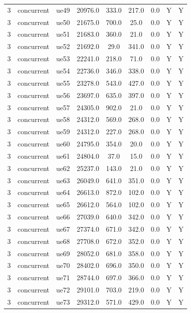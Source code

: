 \begin{table}[ht]
\begin{tabular}{|c|c|c|c|c|c|c|c|c|}
3 & concurrent & ue49 & 20976.0 & 333.0 & 217.0 & 0.0 & Y & Y \\
3 & concurrent & ue50 & 21675.0 & 700.0 & 25.0 & 0.0 & Y & Y \\
3 & concurrent & ue51 & 21683.0 & 360.0 & 21.0 & 0.0 & Y & Y \\
3 & concurrent & ue52 & 21692.0 & 29.0 & 341.0 & 0.0 & Y & Y \\
3 & concurrent & ue53 & 22241.0 & 218.0 & 71.0 & 0.0 & Y & Y \\
3 & concurrent & ue54 & 22736.0 & 346.0 & 338.0 & 0.0 & Y & Y \\
3 & concurrent & ue55 & 23278.0 & 543.0 & 427.0 & 0.0 & Y & Y \\
3 & concurrent & ue56 & 23697.0 & 635.0 & 397.0 & 0.0 & Y & Y \\
3 & concurrent & ue57 & 24305.0 & 902.0 & 21.0 & 0.0 & Y & Y \\
3 & concurrent & ue58 & 24312.0 & 569.0 & 268.0 & 0.0 & Y & Y \\
3 & concurrent & ue59 & 24312.0 & 227.0 & 268.0 & 0.0 & Y & Y \\
3 & concurrent & ue60 & 24795.0 & 354.0 & 20.0 & 0.0 & Y & Y \\
3 & concurrent & ue61 & 24804.0 & 37.0 & 15.0 & 0.0 & Y & Y \\
3 & concurrent & ue62 & 25237.0 & 143.0 & 21.0 & 0.0 & Y & Y \\
3 & concurrent & ue63 & 26049.0 & 641.0 & 351.0 & 0.0 & Y & Y \\
3 & concurrent & ue64 & 26613.0 & 872.0 & 102.0 & 0.0 & Y & Y \\
3 & concurrent & ue65 & 26612.0 & 564.0 & 102.0 & 0.0 & Y & Y \\
3 & concurrent & ue66 & 27039.0 & 640.0 & 342.0 & 0.0 & Y & Y \\
3 & concurrent & ue67 & 27374.0 & 671.0 & 342.0 & 0.0 & Y & Y \\
3 & concurrent & ue68 & 27708.0 & 672.0 & 352.0 & 0.0 & Y & Y \\
3 & concurrent & ue69 & 28052.0 & 681.0 & 358.0 & 0.0 & Y & Y \\
3 & concurrent & ue70 & 28402.0 & 696.0 & 350.0 & 0.0 & Y & Y \\
3 & concurrent & ue71 & 28744.0 & 697.0 & 366.0 & 0.0 & Y & Y \\
3 & concurrent & ue72 & 29101.0 & 703.0 & 219.0 & 0.0 & Y & Y \\
3 & concurrent & ue73 & 29312.0 & 571.0 & 429.0 & 0.0 & Y & Y \\

\end{tabular}
\end{table}
